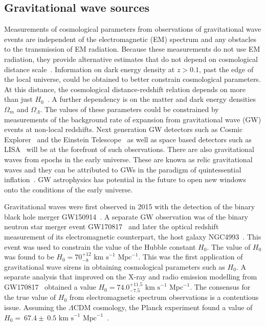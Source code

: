 \documentclass[twocolumn]{article}
\numberwithin{equation}{section}
\begin{document}
\subsection{Gravitational wave sources} %
Measurements of cosmological parameters from observations of gravitational wave events are independent of the 
electromagnetic (EM) spectrum and any obstacles to the transmission of EM radiation. Because these measurements 
do not use EM radiation, they provide alternative estimates that do not depend on cosmological distance 
scale~\cite{gw_distance_scale}. Information on dark energy density at $z>0.1$, past the edge of the local universe, 
could be obtained to better constrain cosmological parameters. At this distance, the cosmological distance-redshift 
relation depends on more than just $H_0$~\cite{gw_cosmology}. A further dependency is on the matter and dark energy 
densities $\Omega_m$ and $\Omega_\Lambda$. The values of these parameters could be constrained by measurements of the 
background rate of expansion from gravitational wave (GW) events at non-local redshifts. Next generation GW detectors 
such as Cosmic Explorer~\cite{cosmic_explorer} and the Einstein Telescope~\cite{einstein_telescope} as well as space 
based detectors such as LISA~\cite{lisa} will be at the forefront of such observations.
There are also gravitational waves from epochs in the early universe. These are known as relic gravitational waves and 
they can be attributed to GWs in the paradigm of quintessential inflation~\cite{relic_gws}. GW astrophysics has potential 
in the future to open new windows onto the conditions of the early universe.

Gravitational waves were first observed in 2015 with the detection of the binary black hole merger GW150914~\cite{gw_detection}.
A separate GW observation was of the binary neutron star merger event GW170817~\cite{GW170817} and later the optical 
redshift measurement of its electromagnetic counterpart, the host galaxy NGC4993~\cite{em_counterpart1, em_counterpart2}. 
This event was used to constrain the value of the Hubble constant $H_0$. The value of $H_0$ was found to be $H_0 = 
70^{+12}_{-8}\text{ km s}^{-1} \text{ Mpc}^{-1}$. This was the first application of gravitational wave sirens in 
obtaining cosmological parameters such as $H_0$. A separate analysis that improved on the X-ray and radio emission 
modelling from GW170817~\cite{GW170817_m2} obtained a value $H_0 = 74.0^{+11.5}_{-7.5}\text{ km s}^{-1} \text{ Mpc}^{-1}$. 
The consensus for the true value of $H_0$ from electromagnetic spectrum observations is a contentious issue. Assuming the 
$\Lambda \text{CDM}$ cosmology, the Planck experiment found a value of $H_0 =~ 67.4 \pm~0.5 \text{ km s}^{-1} 
\text{ Mpc}^{-1}$~\cite{planck}. 
\end{document}
